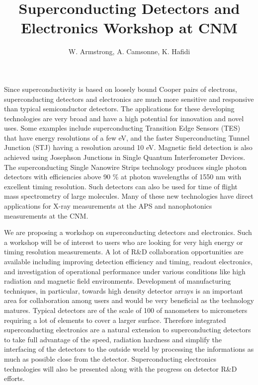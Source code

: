 \documentclass[12pt]{article}
\title{Superconducting Detectors and Electronics Workshop at CNM}
\author{W. Armstrong, A. Camsonne, K. Hafidi}
\begin{document}
\maketitle

Since superconductivity is based on loosely bound Cooper pairs of electrons, 
superconducting detectors and electronics are much more sensitive and 
responsive than typical semiconductor detectors. The applications for these 
developing technologies are very broad and have a high potential for 
innovation and novel uses. Some examples include superconducting Transition Edge 
Sensors (TES) that have energy resolutions of a few eV, and the faster 
Superconducting Tunnel Junction (STJ) having a resolution around 10 eV. 
Magnetic field detection is also achieved using Josephson Junctions in Single 
Quantum Interferometer Devices. The superconducting Single Nanowire Strips 
technology produces single photon detectors with efficiencies above 90 \% at 
photon wavelengths of 1550 nm with excellent timing resolution.  Such detectors 
can also be used for time of flight mass spectrometry of large molecules.  Many 
of these new technologies have direct applications for X-ray measurements at 
the APS and nanophotonics measurements at the CNM.

We are proposing a workshop on superconducting detectors and electronics.
Such a workshop will be of interest to users who are looking for very high 
energy or timing resolution measurements. A lot of R\&D collaboration 
opportunities are available including improving detection efficiency and timing, 
readout electronics, and investigation of operational performance under 
various conditions like high radiation and magnetic field environments.
Development of manufacturing techniques, in particular, towards high density 
detector arrays is an important area for collaboration among users and would 
be very beneficial as the technology matures. Typical detectors are of 
the scale of 100 of nanometers to micrometers requiring a lot of elements to cover 
a larger surface. Therefore integrated superconducting electronics are a natural 
extension to superconducting detectors to take full advantage of the speed, 
radiation hardness and simplify the interfacing of the detectors to the outside 
world by processing the informations as much as possible close from the 
detector. Superconducting electronics technologies will also be presented along 
with the progress on detector R\&D efforts.

\vspace{2cm}
\end{document}
